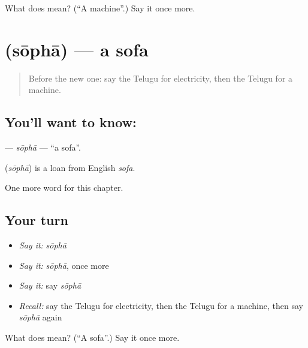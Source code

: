 \begin{tcolorbox}[breakable,colback=teal!4,colframe=teal!35!black,title={Before you move on}]
What does  mean? (\textquotedblleft{}A machine\textquotedblright{}.) Say it once more.
\end{tcolorbox}
\section[\texorpdfstring{\te{సోఫా} (sōphā)}{సోఫా (sōphā)}]{ (sōphā) — a sofa}

\label{lesson:TE-C190-sopha}



\begin{quote}
Before the new one: say the Telugu for electricity, then the Telugu for a machine.
\end{quote}

\subsection*{You'll want to know: }
\textbf{} — \emph{sōphā} — \textquotedblleft{}a sofa\textquotedblright{}.

\begin{cousinweb}
\textbf{} (\emph{sōphā}) is a loan from English \emph{sofa}.
\end{cousinweb}

\begin{grammarlens}[title={What you've built}]
One more word for this chapter.
\end{grammarlens}

\subsection*{Your turn}
\begin{itemize}
\raggedright
  \item \emph{Say it:} \emph{sōphā}
  \item \emph{Say it:} \emph{sōphā}, once more
  \item \emph{Say it:} say \emph{sōphā}
  \item \emph{Recall:} say the Telugu for electricity, then the Telugu for a machine, then say \emph{sōphā} again
\end{itemize}

\begin{tcolorbox}[breakable,colback=teal!4,colframe=teal!35!black,title={Before you move on}]
What does  mean? (\textquotedblleft{}A sofa\textquotedblright{}.) Say it once more.
\end{tcolorbox}
